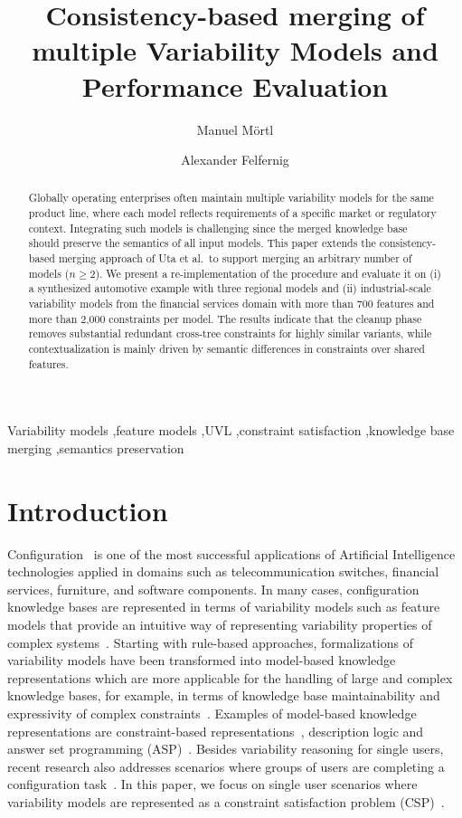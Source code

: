 \documentclass{ceurart}
\title{Consistency-based merging of multiple Variability Models and Performance Evaluation}
\author[1]{Manuel Mörtl}[email=manuel.moertl@tugraz.at]
\author[1]{Alexander Felfernig}[email=alexander.felfernig@ist.tugraz.at]
\begin{document}
\begin{abstract}
Globally operating enterprises often maintain multiple variability models for the same product line, where each model reflects requirements of a specific market or regulatory context. Integrating such models is challenging since the merged knowledge base should preserve the semantics of all input models. This paper extends the consistency-based merging approach of Uta et al.\ to support merging an arbitrary number of models ($n \ge 2$). We present a re-implementation of the procedure and evaluate it on (i) a synthesized automotive example with three regional models and (ii) industrial-scale variability models from the financial services domain with more than 700 features and more than 2{,}000 constraints per model. The results indicate that the cleanup phase removes substantial redundant cross-tree constraints for highly similar variants, while contextualization is mainly driven by semantic differences in constraints over shared features.
\end{abstract}

\begin{keywords}
Variability models \sep feature models \sep UVL \sep constraint satisfaction \sep knowledge base merging \sep semantics preservation
\end{keywords}

\maketitle
\section{Introduction}
Configuration~\cite{Stumptner1997,Felfernig2014} is one of the most successful applications of Artificial Intelligence technologies applied in domains such as telecommunication switches, financial services, furniture, and software components. In many cases, configuration knowledge bases are represented in terms of variability models such as feature models that provide an intuitive way of representing variability properties of complex systems~\cite{Kang1990,Czarnecki2005}. Starting with rule-based approaches, formalizations of variability models have been transformed into model-based knowledge representations which are more applicable for the handling of large and complex knowledge bases, for example, in terms of knowledge base maintainability and expressivity of complex constraints~\cite{Benavides2010,Felfernig2014}. Examples of model-based knowledge representations are constraint-based representations~\cite{Tsang1993}, description logic and answer set programming (ASP)~\cite{Felfernig2014}. Besides variability reasoning for single users, recent research also addresses scenarios where groups of users are completing a configuration task~\cite{Felfernig2018}. In this paper, we focus on single user scenarios where variability models are represented as a constraint satisfaction problem (CSP)~\cite{Benavides2005,Tsang1993}.
\end{document}
